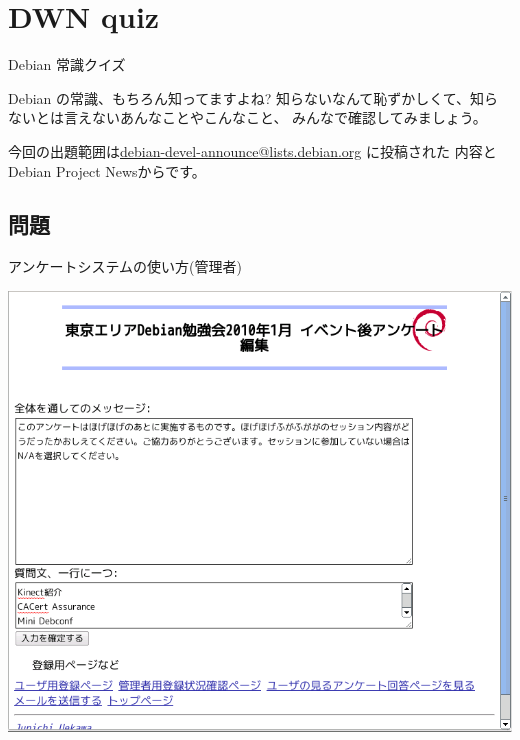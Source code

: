 
\section{DWN quiz}
\begin{frame}{Debian 常識クイズ}

Debian の常識、もちろん知ってますよね?
知らないなんて恥ずかしくて、知らないとは言えないあんなことやこんなこと、
みんなで確認してみましょう。

今回の出題範囲は\url{debian-devel-announce@lists.debian.org} に投稿された
内容とDebian Project Newsからです。

\end{frame}

\subsection{問題}



{\footnotesize
 
}


\begin{frame}{アンケートシステムの使い方(管理者)}

\includegraphics[width=0.8\vsize]{image201101/enquete-edit.png}

\end{frame}

